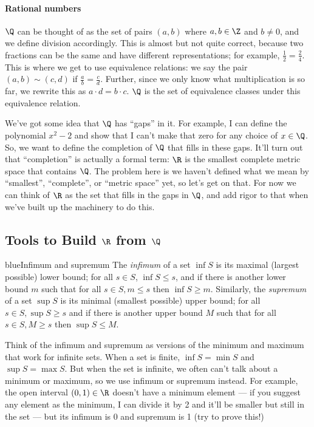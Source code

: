 \documentclass[./analysis.tex]{subfiles}
\begin{document}
    \paragraph*{Rational numbers} $\Q$ can be thought of as the set of pairs $(a, b)$ where $a, b \in \Z$ and $b \neq 0$, and we define division accordingly. This is almost but not quite correct, because two fractions can be the same and have different representations; for example, $\frac{1}{2} = \frac{2}{4}$. This is where we get to use equivalence relations: we say the pair $(a, b) \sim (c, d)$ if $\frac{a}{b} = \frac{c}{d}$. Further, since we only know what multiplication is so far, we rewrite this as $a \cdot d = b \cdot c$. $\Q$ is the set of equivalence classes under this equivalence relation.

    We've got some idea that $\Q$ has ``gaps'' in it. For example, I can define the polynomial $x^2 - 2$ and show that I can't make that zero for any choice of $x \in \Q$. So, we want to define the completion of $\Q$ that fills in these gaps. It'll turn out that ``completion'' is actually a formal term: $\R$ is the smallest complete metric space that contains $\Q$. The problem here is we haven't defined what we mean by ``smallest'', ``complete'', or ``metric space'' yet, so let's get on that. For now we can think of $\R$ as the set that fills in the gaps in $\Q$, and add rigor to that when we've built up the machinery to do this.

    \subsection{Tools to Build $\R$ from $\Q$}

    \begin{mycolorbox}{blue}{Infimum and supremum}
    The \emph{infimum} of a set $\inf S$ is its maximal (largest possible) lower bound; for all $s \in S$, $\inf S \leq s$, and if there is another lower bound $m$ such that for all $s \in S, m \leq s$ then $\inf S \geq m$. Similarly, the \emph{supremum} of a set $\sup S$ is its minimal (smallest possible) upper bound; for all $s \in S, \sup S \geq s$ and if there is another upper bound $M$ such that for all $s \in S, M \geq s$ then $\sup S \leq M$.
    \end{mycolorbox}

    Think of the infimum and supremum as versions of the minimum and maximum that work for infinite sets. When a set is finite, $\inf S = \min S$ and $\sup S = \max S$. But when the set is infinite, we often can't talk about a minimum or maximum, so we use infimum or supremum instead. For example, the open interval $(0, 1) \in \R$ doesn't have a minimum element --- if you suggest any element as the minimum, I can divide it by 2 and it'll be smaller but still in the set --- but its infimum is 0 and supremum is 1 (try to prove this!)
\end{document}
